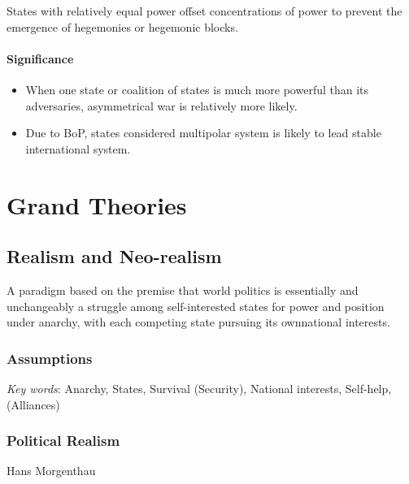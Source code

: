 \documentclass[
]{book}
\begin{document}
States with relatively equal power offset concentrations of power to prevent the emergence of hegemonies or hegemonic blocks.

\hypertarget{significance-5}{%
\subsubsection{Significance}\label{significance-5}}

\begin{itemize}
\item
  When one state or coalition of states is much more powerful than its adversaries, asymmetrical war is relatively more likely.
\item
  Due to BoP, states considered multipolar system is likely to lead stable international system.
\end{itemize}

\hypertarget{grand-theories}{%
\chapter{Grand Theories}\label{grand-theories}}

\hypertarget{realism-and-neo-realism}{%
\section{Realism and Neo-realism}\label{realism-and-neo-realism}}

A paradigm based on the premise that world politics is essentially and unchangeably a struggle among self-interested states for power and position under anarchy, with each competing state pursuing its ownnational interests.

\hypertarget{assumptions}{%
\subsection{Assumptions}\label{assumptions}}

\emph{Key words}: Anarchy, States, Survival (Security), National interests, Self-help, (Alliances)

\hypertarget{political-realism}{%
\subsection{Political Realism}\label{political-realism}}

Hans Morgenthau
\end{document}
